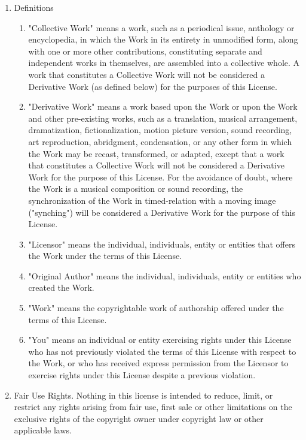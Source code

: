 \begin{enumerate}
  \item {Definitions} 
  \begin {enumerate} 
    \item {"Collective Work" means a work, such as a periodical issue, anthology
    or encyclopedia, in which the Work in its entirety in unmodified form, along
    with one or more other contributions, constituting separate and independent
    works in themselves, are assembled into a collective whole. A work that
    constitutes a Collective Work will not be considered a Derivative Work (as
    defined below) for the purposes of this License.}
    \item {"Derivative Work" means a work based upon the Work or upon the Work
    and other pre-existing works, such as a translation, musical arrangement,
    dramatization, fictionalization, motion picture version, sound recording,
    art reproduction, abridgment, condensation, or any other form in which the
    Work may be recast, transformed, or adapted, except that a work that
    constitutes a Collective Work will not be considered a Derivative Work for
    the purpose of this License. For the avoidance of doubt, where the Work is a
    musical composition or sound recording, the synchronization of the Work in
    timed-relation with a moving image ("synching") will be considered a
    Derivative Work for the purpose of this License.}
    \item {"Licensor" means the individual, individuals, entity or entities that
    offers the Work under the terms of this License.}
    \item {"Original Author" means the individual, individuals, entity or
    entities who created the Work.}
    \item {"Work" means the copyrightable work of authorship offered under the
    terms of this License.}
    \item {"You" means an individual or entity exercising rights under this
    License who has not previously violated the terms of this License with
    respect to the Work, or who has received express permission from the
    Licensor to exercise rights under this License despite a previous
    violation.}
  \end{enumerate}

  \item {Fair Use Rights. Nothing in this license is intended to reduce, limit,
  or restrict any rights arising from fair use, first sale or other limitations
  on the exclusive rights of the copyright owner under copyright law or other
  applicable laws.}


\end{enumerate}
